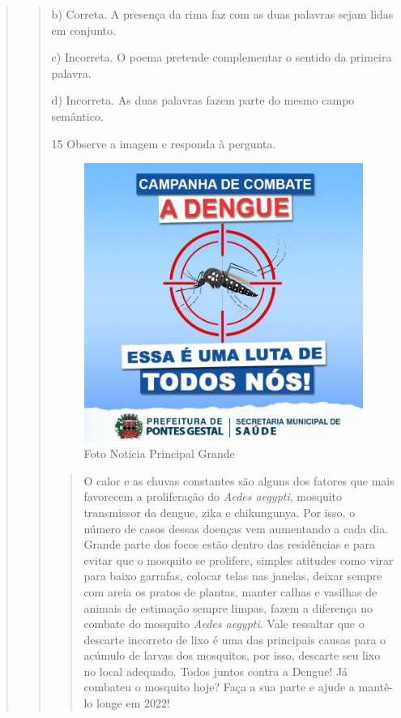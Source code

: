 \begin{escolha}
\begin{escolha}
\begin{escolha}
\begin{quote}
\begin{quote}
{b) Correta. A presença da rima faz com as duas palavras sejam
lidas em conjunto.

c) Incorreta. O poema pretende complementar o sentido da primeira
palavra.

d) Incorreta. As duas palavras fazem parte do mesmo campo
semântico.}

\num{15} Observe a imagem e responda à pergunta.

\begin{figure}
\centering
\includegraphics{./imgQ4PORT/media/image3.jpeg}
\caption{Foto Noticia Principal Grande}
\end{figure}

\begin{quote}
O calor e as chuvas constantes são alguns dos fatores que mais
favorecem a proliferação do \textit{Aedes aegypti}, mosquito transmissor da
dengue, zika e chikungunya. Por isso, o número de casos dessas doenças
vem aumentando a cada dia. Grande parte dos focos estão dentro das
residências e para evitar que o mosquito se prolifere, simples atitudes
como virar para baixo garrafas, colocar telas nas janelas, deixar sempre
com areia os pratos de plantas, manter calhas e vasilhas de animais de
estimação sempre limpas, fazem a diferença no combate do mosquito 
\textit{Aedes aegypti}. Vale ressaltar que o descarte incorreto de 
lixo é uma das principais causas para o acúmulo de larvas dos mosquitos,
por isso, descarte seu lixo no local adequado. Todos juntos contra a
Dengue! Já combateu o mosquito hoje? Faça a sua parte e ajude a mantê-lo
longe em 2022!
\end{quote}


\end{quote}
\end{quote}
\end{escolha}
\end{escolha}
\end{escolha}
